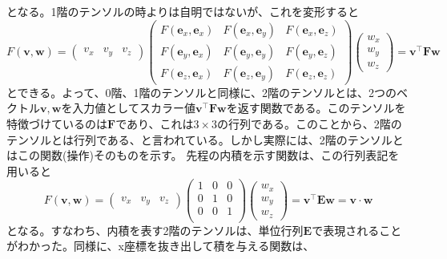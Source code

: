 となる。1階のテンソルの時よりは自明ではないが、これを変形すると
\begin{equation}
	F(\boldsymbol{v},\boldsymbol{w}) =
	\begin{pmatrix}
		v_x & v_y & v_z
	\end{pmatrix}
	\begin{pmatrix}
		F(\boldsymbol{e}_x,\boldsymbol{e}_x) & F(\boldsymbol{e}_x,\boldsymbol{e}_y) & F(\boldsymbol{e}_x,\boldsymbol{e}_z) \\
		F(\boldsymbol{e}_y,\boldsymbol{e}_x) & F(\boldsymbol{e}_y,\boldsymbol{e}_y) & F(\boldsymbol{e}_y,\boldsymbol{e}_z) \\
		F(\boldsymbol{e}_z,\boldsymbol{e}_x) & F(\boldsymbol{e}_z,\boldsymbol{e}_y) & F(\boldsymbol{e}_z,\boldsymbol{e}_z)
	\end{pmatrix}
	\begin{pmatrix}
		w_x \\ w_y \\ w_z
	\end{pmatrix}
	= \boldsymbol{v}^{\top}\boldsymbol{F}\boldsymbol{w}
\end{equation}
とできる。よって、0階、1階のテンソルと同様に、2階のテンソルとは、2つのベクトル\(\boldsymbol{v},\boldsymbol{w}\)を入力値としてスカラー値\(\boldsymbol{v}^{\top}\boldsymbol{F}\boldsymbol{w}\)を返す関数である。このテンソルを特徴づけているのは\(\boldsymbol{F}\)であり、これは\(3 \times 3\)の行列である。このことから、2階のテンソルとは行列である、と言われている。しかし実際には、2階のテンソルとはこの関数(操作)そのものを示す。
先程の内積を示す関数は、この行列表記を用いると
\begin{equation}
	F(\boldsymbol{v},\boldsymbol{w}) =
	\begin{pmatrix}
		v_x & v_y & v_z
	\end{pmatrix}
	\begin{pmatrix}
		1 & 0 & 0 \\
		0 & 1 & 0 \\
		0 & 0 & 1 \\
	\end{pmatrix}
	\begin{pmatrix}
		w_x \\ w_y \\ w_z
	\end{pmatrix}
	= \boldsymbol{v}^{\top}\boldsymbol{E}\boldsymbol{w}=\boldsymbol{v}\cdot\boldsymbol{w}
\end{equation}
となる。すなわち、内積を表す2階のテンソルは、単位行列\(\boldsymbol{E}\)で表現されることがわかった。同様に、x座標を抜き出して積を与える関数は、
